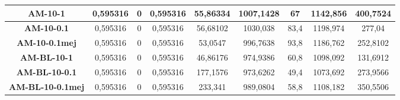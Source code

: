 \documentclass[12pt, spanish]{article}
\begin{document}
\begin{table}[H]
\begin{tabular}{|c|c|c|c|c|c|c|c|c|}
\textbf{AM-10-1}         & 0,595316                  & 0                           & 0,595316               & 55,86334   & 1007,1428                 & 67                          & 1142,856               & 400,7524   \\ \hline
\textbf{AM-10-0.1}       & 0,595316                  & 0                           & 0,595316               & 56,68102   & 1030,038                  & 83,4                        & 1198,974               & 277,04     \\ \hline
\textbf{AM-10-0.1mej}    & 0,595316                  & 0                           & 0,595316               & 53,0547    & 996,7638                  & 93,8                        & 1186,762               & 252,8102   \\ \hline
\textbf{AM-BL-10-1}      & 0,595316                  & 0                           & 0,595316               & 46,86176   & 974,9386                  & 60,8                        & 1098,092               & 131,6912   \\ \hline
\textbf{AM-BL-10-0.1}    & 0,595316                  & 0                           & 0,595316               & 177,1576   & 973,6262                  & 49,4                        & 1073,692               & 273,9566   \\ \hline
\textbf{AM-BL-10-0.1mej} & 0,595316                  & 0                           & 0,595316               & 233,341    & 989,0804                  & 58,8                        & 1108,182               & 350,5506   \\ \hline
\end{tabular}
\end{table}
\end{document}
